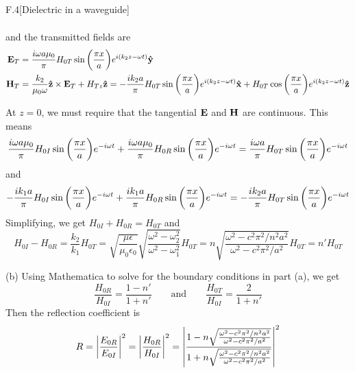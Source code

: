 \documentclass[12pt]{article}
\begin{document}
\begin{problem}{F.4}[Dielectric in a waveguide]
\begin{solution}
\begin{subequations}
\begin{align}
    \end{align} 
\end{subequations}
and the transmitted fields are
\begin{subequations}
    \begin{align}
        \vb{E}_T&=\frac{i\omega a\mu_0}{\pi}H_{0T}\sin\qty(\frac{\pi
        x}{a})e^{i(k_2z-\omega t)}\vb{\hat{y}}\\
        \vb{H}_T&=\frac{k_2}{\mu_0\omega}\vb{\hat{z}}\times\vb{E}_T+
        H_{Tz}\vb{\hat{z}}=
        -\frac{ik_2a}{\pi}H_{0T}\sin\qty(\frac{\pi x}{a})e^{i(k_2z-\omega
        t)}\vb{\hat{x}}+
        H_{0T}\cos\qty(\frac{\pi x}{a})e^{i(k_2z-\omega t)}\vb{\hat{z}}
    \end{align} 
\end{subequations}

At $z=0$, we must require that the tangential $\vb{E}$ and $\vb{H}$ are
continuous. This means
\begin{equation}
    \frac{i\omega a\mu_0}{\pi}H_{0I}\sin\qty(\frac{\pi x}{a})e^{-i\omega t}
    +\frac{i\omega a\mu_0}{\pi}H_{0R}\sin\qty(\frac{\pi x}{a})e^{-i\omega t}
    =\frac{i\omega a}{\pi}H_{0T}\sin\qty(\frac{\pi x}{a})e^{-i\omega t}
\end{equation}
and
\begin{equation}
    -\frac{ik_1a}{\pi}H_{0I}\sin\qty(\frac{\pi x}{a})e^{-i\omega t}
    +\frac{ik_1a}{\pi}H_{0R}\sin\qty(\frac{\pi x}{a})e^{-i\omega t}
    =-\frac{ik_2a}{\pi}H_{0T}\sin\qty(\frac{\pi x}{a})e^{-i\omega t}
\end{equation}
Simplifying, we get $H_{0I}+H_{0R}=H_{0T}$ and
\begin{equation}
    H_{0I}-H_{0R}=\frac{k_2}{k_1}H_{0T}
    =\sqrt{\frac{\mu\epsilon}{\mu_0\epsilon_0}}\sqrt{\frac{\omega^2-\omega_2^2}{\omega^2-\omega_1^2}}H_{0T}
    =n\sqrt{\frac{\omega^2-c^2\pi^2/n^2a^2}{\omega^2-c^2\pi^2/a^2}}H_{0T}
    =n'H_{0T}
\end{equation}

(b) Using Mathematica to solve for the boundary conditions in part (a), we get
\begin{equation}
    \frac{H_{0R}}{H_{0I}}=\frac{1-n'}{1+n'}\qquad\text{and}\qquad
    \frac{H_{0T}}{H_{0I}}=\frac{2}{1+n'}
\end{equation}
Then the reflection coefficient is
\begin{align}
    R=\abs{\frac{E_{0R}}{E_{0I}}}^2= \abs{\frac{H_{0R}}{H_{0I}}}^2
    =\abs{\frac{1-n\sqrt{\frac{\omega^2-c^2\pi^2/n^2a^2}{\omega^2-c^2\pi^2/a^2}}}{1+n\sqrt{\frac{\omega^2-c^2\pi^2/n^2a^2}{\omega^2-c^2\pi^2/a^2}}}}^2
\end{align}
\end{solution}
\end{problem}
\end{document}
